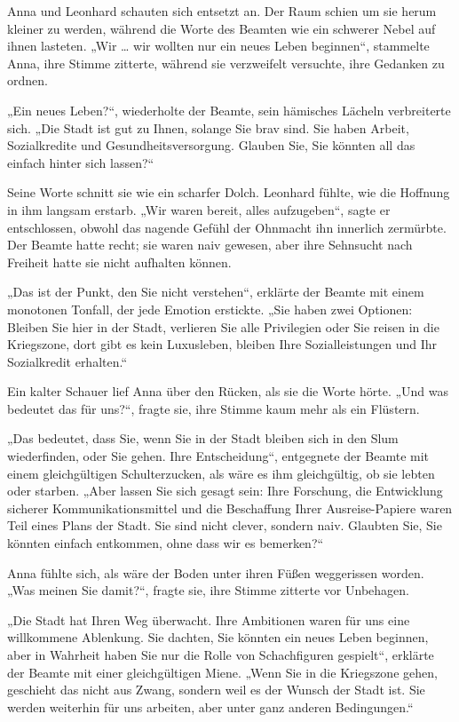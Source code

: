 \documentclass[
]{article}
\begin{document}
Anna und Leonhard schauten sich entsetzt an. Der Raum schien um sie
herum kleiner zu werden, während die Worte des Beamten wie ein schwerer
Nebel auf ihnen lasteten. „Wir \ldots{} wir wollten nur ein neues Leben
beginnen``, stammelte Anna, ihre Stimme zitterte, während sie
verzweifelt versuchte, ihre Gedanken zu ordnen.

„Ein neues Leben?{\kern0pt}``, wiederholte der Beamte, sein hämisches
Lächeln verbreiterte sich. „Die Stadt ist gut zu Ihnen, solange Sie brav
sind. Sie haben Arbeit, Sozialkredite und Gesundheitsversorgung. Glauben
Sie, Sie könnten all das einfach hinter sich lassen?{\kern0pt}``

Seine Worte schnitt sie wie ein scharfer Dolch. Leonhard fühlte, wie die
Hoffnung in ihm langsam erstarb. „Wir waren bereit, alles aufzugeben``,
sagte er entschlossen, obwohl das nagende Gefühl der Ohnmacht ihn
innerlich zermürbte. Der Beamte hatte recht; sie waren naiv gewesen,
aber ihre Sehnsucht nach Freiheit hatte sie nicht aufhalten können.

„Das ist der Punkt, den Sie nicht verstehen``, erklärte der Beamte mit
einem monotonen Tonfall, der jede Emotion erstickte. „Sie haben zwei
Optionen: Bleiben Sie hier in der Stadt, verlieren Sie alle Privilegien
oder Sie reisen in die Kriegszone, dort gibt es kein Luxusleben, bleiben
Ihre Sozialleistungen und Ihr Sozialkredit erhalten.``

Ein kalter Schauer lief Anna über den Rücken, als sie die Worte hörte.
„Und was bedeutet das für uns?{\kern0pt}``, fragte sie, ihre Stimme kaum
mehr als ein Flüstern.

„Das bedeutet, dass Sie, wenn Sie in der Stadt bleiben sich in den Slum
wiederfinden, oder Sie gehen. Ihre Entscheidung``, entgegnete der Beamte
mit einem gleichgültigen Schulterzucken, als wäre es ihm gleichgültig,
ob sie lebten oder starben. „Aber lassen Sie sich gesagt sein: Ihre
Forschung, die Entwicklung sicherer Kommunikationsmittel und die
Beschaffung Ihrer Ausreise-Papiere waren Teil eines Plans der Stadt. Sie
sind nicht clever, sondern naiv. Glaubten Sie, Sie könnten einfach
entkommen, ohne dass wir es bemerken?{\kern0pt}``

Anna fühlte sich, als wäre der Boden unter ihren Füßen weggerissen
worden. „Was meinen Sie damit?{\kern0pt}``, fragte sie, ihre Stimme
zitterte vor Unbehagen.

„Die Stadt hat Ihren Weg überwacht. Ihre Ambitionen waren für uns eine
willkommene Ablenkung. Sie dachten, Sie könnten ein neues Leben
beginnen, aber in Wahrheit haben Sie nur die Rolle von Schachfiguren
gespielt``, erklärte der Beamte mit einer gleichgültigen Miene. „Wenn
Sie in die Kriegszone gehen, geschieht das nicht aus Zwang, sondern weil
es der Wunsch der Stadt ist. Sie werden weiterhin für uns arbeiten, aber
unter ganz anderen Bedingungen.``
\end{document}
